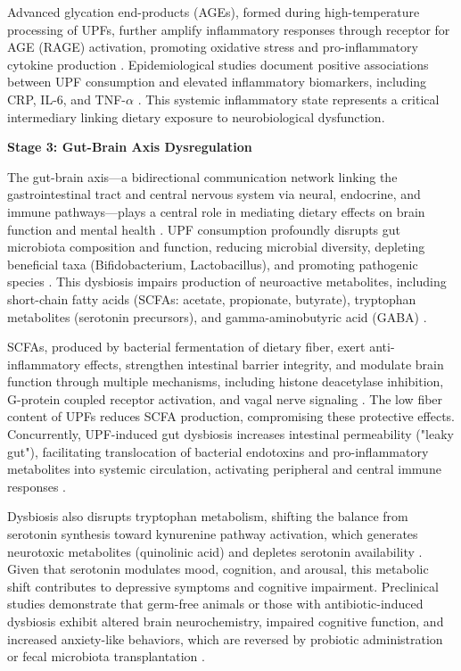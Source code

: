 \documentclass[journal,twoside,10pt]{IEEEtran}
\begin{document}
Advanced glycation end-products (AGEs), formed during high-temperature processing of UPFs, further amplify inflammatory responses through receptor for AGE (RAGE) activation, promoting oxidative stress and pro-inflammatory cytokine production \cite{ref10}. Epidemiological studies document positive associations between UPF consumption and elevated inflammatory biomarkers, including CRP, IL-6, and TNF-$\alpha$ \cite{ref42}. This systemic inflammatory state represents a critical intermediary linking dietary exposure to neurobiological dysfunction.

\textbf{Stage 3: Gut-Brain Axis Dysregulation}

The gut-brain axis---a bidirectional communication network linking the gastrointestinal tract and central nervous system via neural, endocrine, and immune pathways---plays a central role in mediating dietary effects on brain function and mental health \cite{ref9,ref37,ref39}. UPF consumption profoundly disrupts gut microbiota composition and function, reducing microbial diversity, depleting beneficial taxa (Bifidobacterium, Lactobacillus), and promoting pathogenic species \cite{ref9,ref37}. This dysbiosis impairs production of neuroactive metabolites, including short-chain fatty acids (SCFAs: acetate, propionate, butyrate), tryptophan metabolites (serotonin precursors), and gamma-aminobutyric acid (GABA) \cite{ref9,ref37}.

SCFAs, produced by bacterial fermentation of dietary fiber, exert anti-inflammatory effects, strengthen intestinal barrier integrity, and modulate brain function through multiple mechanisms, including histone deacetylase inhibition, G-protein coupled receptor activation, and vagal nerve signaling \cite{ref9,ref53}. The low fiber content of UPFs reduces SCFA production, compromising these protective effects. Concurrently, UPF-induced gut dysbiosis increases intestinal permeability ("leaky gut"), facilitating translocation of bacterial endotoxins and pro-inflammatory metabolites into systemic circulation, activating peripheral and central immune responses \cite{ref9,ref37,ref39}.

Dysbiosis also disrupts tryptophan metabolism, shifting the balance from serotonin synthesis toward kynurenine pathway activation, which generates neurotoxic metabolites (quinolinic acid) and depletes serotonin availability \cite{ref9}. Given that serotonin modulates mood, cognition, and arousal, this metabolic shift contributes to depressive symptoms and cognitive impairment. Preclinical studies demonstrate that germ-free animals or those with antibiotic-induced dysbiosis exhibit altered brain neurochemistry, impaired cognitive function, and increased anxiety-like behaviors, which are reversed by probiotic administration or fecal microbiota transplantation \cite{ref9,ref53}.
\end{document}

